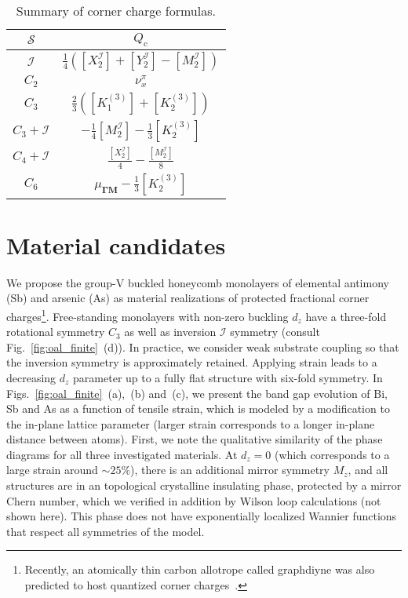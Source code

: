 \begin{table}[H]
\centering
\begin{tabular}{| c || c |}
\hline
$\mathcal{S}$ & $Q_\mathrm{c}$ \\ \hline
$\mathcal{I}$ & $\frac{1}{4}\left([X^\mathcal{I}_2] + [Y^\mathcal{I}_2] - [M^\mathcal{I}_2]\right)$ \\ \hline
$C_2$ & $\nu_{x}^{\pi}$ \\ \hline
$C_3$ & $\frac{2}{3} ([K^{(3)}_1]+[K^{(3)}_2])$ \\ \hline
$C_3 + \mathcal{I}$ & $- \frac{1}{4} [M^\mathcal{I}_2] -\frac{1}{3} [K^{(3)}_2]$ \\ \hline
$C_4 + \mathcal{I}$ & $\frac{[X^\mathcal{I}_2]}{4} - \frac{[M^\mathcal{I}_2]}{8}$ \\ \hline
$C_6$ & $\mu_{\mathbf{\Gamma M}} -\frac{1}{3} [K^{(3)}_2]$ \\ \hline
\end{tabular}
\caption[Summary of corner charge formulas]{Summary of corner charge formulas.}
\label{tab:sum}
\end{table}

\section{Material candidates}
\label{sec:materials}
We propose the group-V buckled honeycomb monolayers of elemental antimony (Sb) and arsenic (As) as material realizations of protected fractional corner charges\footnote{Recently, an atomically thin carbon allotrope called graphdiyne was also predicted to host quantized corner charges~\cite{GDY12019, GDY22019}.}. Free-standing monolayers with non-zero buckling $d_z$ have a three-fold rotational symmetry $C_3$ as well as inversion $\mathcal{I}$ symmetry (consult Fig.~\ref{fig:oal_finite}~(d)). In practice, we consider weak substrate coupling so that the inversion symmetry is approximately retained. Applying strain leads to a decreasing $d_z$ parameter up to a fully flat structure with six-fold symmetry. In Figs.~\ref{fig:oal_finite}~(a),~(b) and~(c), we present the band gap evolution of Bi, Sb and As as a function of tensile strain, which is modeled by a modification to the in-plane lattice parameter (larger strain corresponds to a longer in-plane distance between atoms). First, we note the qualitative similarity of the phase diagrams for all three investigated materials. At $d_z = 0$ (which corresponds to a large strain around $\sim 25\%$), there is an additional mirror symmetry $M_z$, and all structures are in an topological crystalline insulating phase, protected by a mirror Chern number, which we verified in addition by Wilson loop calculations (not shown here). This phase does not have exponentially localized Wannier functions that respect all symmetries of the model. 

